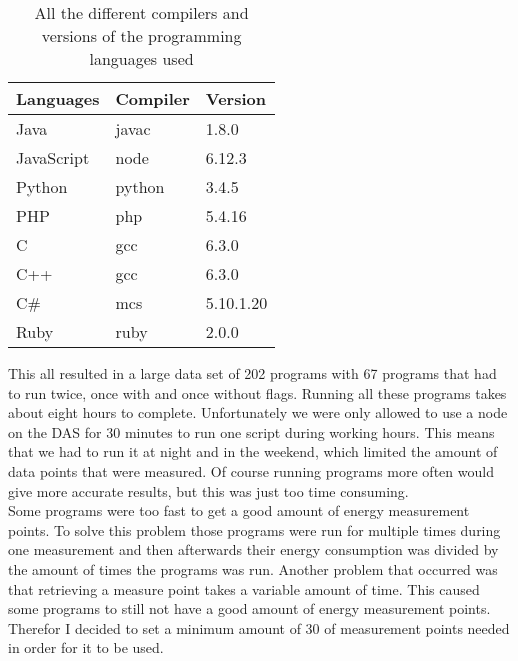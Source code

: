 \begin{table}[h]
\centering
\begin{tabular}{|l|l|l|}
\hline
\textbf{Languages}  & \textbf{Compiler} & \textbf{Version}   \\ \hline
Java       & javac    & 1.8.0\textunderscore161 \\ \hline
JavaScript & node     & 6.12.3    \\ \hline
Python     & python   & 3.4.5     \\ \hline
PHP        & php      & 5.4.16    \\ \hline
C          & gcc      & 6.3.0     \\ \hline
C++        & gcc      & 6.3.0     \\ \hline
C\#         & mcs      & 5.10.1.20 \\ \hline
Ruby       & ruby     & 2.0.0     \\ \hline
\end{tabular}
\caption{All the different compilers and versions of the programming languages used}
\label{tab:version}
\end{table}

This all resulted in a large data set of 202 programs with 67 programs that had to run twice, once with and once without flags. Running all these programs takes about eight hours to complete. Unfortunately we were only allowed to use a node on the DAS for 30 minutes to run one script during working hours. This means that we had to run it at night and in the weekend, which limited the amount of data points that were measured. Of course running programs more often would give more accurate results, but this was just too time consuming.\\

Some programs were too fast to get a good amount of energy measurement points. To solve this problem those programs were run for multiple times during one measurement and then afterwards their energy consumption was divided by the amount of times the programs was run. Another problem that occurred was that retrieving a measure point takes a variable amount of time. This caused some programs to still not have a good amount of energy measurement points. Therefor I decided to set a minimum amount of 30 of measurement points needed in order for it to be used. \\

